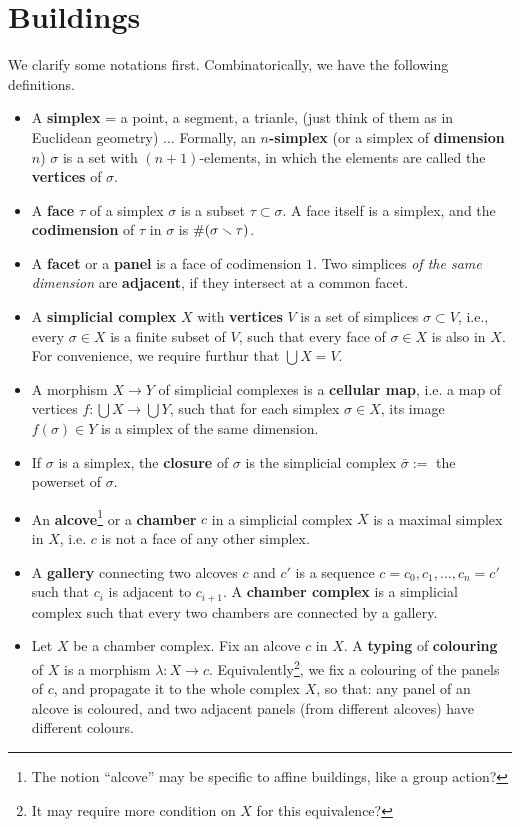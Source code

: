 \documentclass{article}
\begin{document}
\section{Buildings}
We clarify some notations first.
Combinatorically, we have the following definitions.
\begin{itemize}
\item A \textbf{simplex} = a point, a segment, a trianle, (just think of them as in Euclidean geometry) ...
Formally, an \textbf{$n$-simplex} (or a simplex of \textbf{dimension} $n$) $\sigma$ is a set with $(n + 1)$-elements, in which the elements are called the \textbf{vertices} of $\sigma$.

\item A \textbf{face} $\tau$ of a simplex $\sigma$ is a subset $\tau\subset\sigma$.
A face itself is a simplex,
and the \textbf{codimension} of $\tau$ in $\sigma$ is $\#(\sigma\smallsetminus\tau)$.

\item A \textbf{facet} or a \textbf{panel} is a face of codimension $1$.
Two simplices \textit{of the same dimension} are \textbf{adjacent},
if they intersect at a common facet.

\item A \textbf{simplicial complex} $X$ with \textbf{vertices} $V$ is a set of simplices $\sigma\subset V$, i.e., every $\sigma\in X$ is a finite subset of $V$,
such that every face of $\sigma\in X$ is also in $X$.
For convenience, we require furthur that $\bigcup X = V$.

\item A morphism $X\to Y$ of simplicial complexes is a \textbf{cellular map}, i.e. a map of vertices $f : \bigcup X\to\bigcup Y$,
such that for each simplex $\sigma\in X$,
its image $f(\sigma)\in Y$ is a simplex of the same dimension.


\item If $\sigma$ is a simplex, the \textbf{closure} of $\sigma$ is the simplicial complex $\bar\sigma := $ the powerset of $\sigma$.

\item An \textbf{alcove}\footnote{
    The notion ``alcove'' may be specific to affine buildings, like a group action?
} or a \textbf{chamber} $c$ in a simplicial complex $X$ is a maximal simplex in $X$, i.e. $c$ is not a face of any other simplex.

\item A \textbf{gallery} connecting two alcoves $c$ and $c'$ is a sequence $c = c_0, c_1, \dots, c_n = c'$ such that $c_i$ is adjacent to $c_{i+1}$.
A \textbf{chamber complex} is a simplicial complex such that every two chambers are connected by a gallery.

\item Let $X$ be a chamber complex. Fix an alcove $c$ in $X$.
A \textbf{typing} of \textbf{colouring}
of $X$ is a morphism $\lambda : X\to c$.
Equivalently\footnote{
    It may require more condition on $X$ for this equivalence?
}, we fix a colouring of the panels of $c$,
and propagate it to the whole complex $X$,
so that: any panel of an alcove is coloured,
and two adjacent panels (from different alcoves) have different colours.


\end{itemize}
\end{document}
